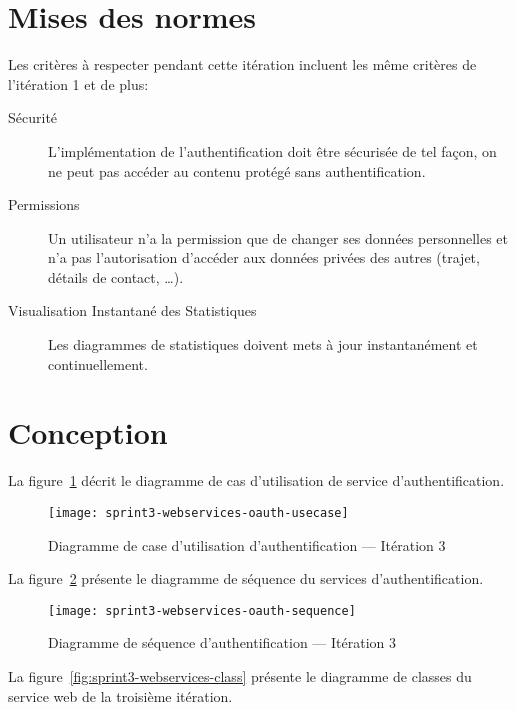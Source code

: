 \section{Mises des normes}

Les critères à respecter pendant cette itération incluent les même critères de
l'itération 1 et de plus:

\begin{description}
    \item [Sécurité] L'implémentation de l'authentification doit être sécurisée
        de tel façon, on ne peut pas accéder au contenu protégé sans
        authentification.
    \item [Permissions] Un utilisateur n'a la permission que de changer ses
        données personnelles et n'a pas l'autorisation d'accéder aux données privées
        des autres (trajet, détails de contact, \ldots).
    \item [Visualisation Instantané des Statistiques] Les diagrammes de
        statistiques doivent mets à jour instantanément et continuellement.
\end{description}

\section{Conception}

La figure~\ref{fig:sprint3-webservices-oauth-usecase} décrit le diagramme
de cas d'utilisation de service d'authentification.

\begin{figure}[H]
    \centering
    \texttt{[image: sprint3-webservices-oauth-usecase]}
    \caption{Diagramme de case d'utilisation d'authentification --- Itération 3}
\label{fig:sprint3-webservices-oauth-usecase}
\end{figure}

La figure~\ref{fig:sprint3-webservices-oauth-sequence} présente le diagramme de
séquence du services d'authentification.

\begin{figure}[H]
    \centering
    \texttt{[image: sprint3-webservices-oauth-sequence]}
    \caption{Diagramme de séquence d'authentification --- Itération 3}
\label{fig:sprint3-webservices-oauth-sequence}
\end{figure}

La figure~\ref{fig:sprint3-webservices-class} présente le diagramme de
classes du service web de la troisième itération.

